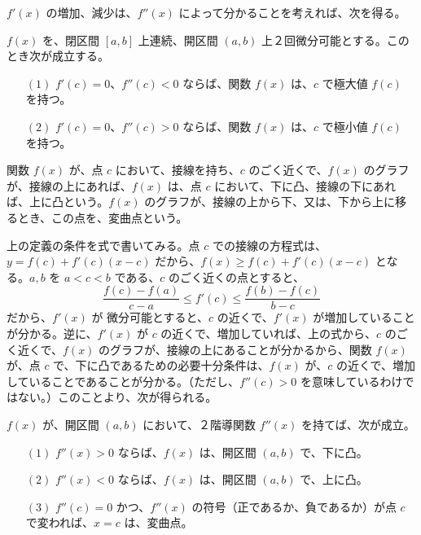 $f'(x)$ の増加、減少は、$f''(x)$ によって分かることを考えれば、次を得る。
\begin{prop}
$f(x)$ を、閉区間 $[a,b]$ 上連続、開区間 $(a,b)$  上２回微分可能とする。このとき次が成立する。
\begin{itemize}
\item[$(1)$] $f'(c) = 0$、$f''(c) < 0$ ならば、関数 $f(x)$ は、$c$ で極大値 $f(c)$ を持つ。
\item[$(2)$] $f'(c) = 0$、$f''(c) > 0$ ならば、関数 $f(x)$ は、$c$ で極小値 $f(c)$ を持つ。
\end{itemize}
\end{prop}

\begin{definition}
関数 $f(x)$ が、点 $c$ において、接線を持ち、$c$ のごく近くで、$f(x)$ のグラフが、接線の上にあれば、$f(x)$ は、点 $c$ において、下に凸、接線の下にあれば、上に凸という。$f(x)$ のグラフが、接線の上から下、又は、下から上に移るとき、この点を、変曲点という。
\end{definition}

上の定義の条件を式で書いてみる。点 $c$ での接線の方程式は、$y = f(c) + f'(c) (x-c)$ だから、$f(x)\geq f(c) + f'(c)(x-c)$ となる。$a, b$ を $a < c < b$  である、$c$ のごく近くの点とすると、
$$\frac{f(c) - f(a)}{c-a} \leq f'(c) \leq \frac{f(b) - f(c)}{b-c}$$
だから、$f'(x)$ が 微分可能とすると、$c$ の近くで、$f'(x)$ が増加していることが分かる。逆に、$f'(x)$ が $c$ の近くで、増加していれば、上の式から、$c$ のごく近くで、$f(x)$ のグラフが、接線の上にあることが分かるから、関数 $f(x)$ が、点 $c$ で、下に凸であるための必要十分条件は、$f(x)$ が、$c$ の近くで、増加していることであることが分かる。（ただし、$f''(c)>0$ を意味しているわけではない。）このことより、次が得られる。

\begin{prop}
$f(x)$ が、開区間 $(a,b)$ において、２階導関数 $f''(x)$ を持てば、次が成立。
\begin{itemize}
\item[$(1)$]  $f''(x)>0$ ならば、$f(x)$ は、開区間 $(a,b)$ で、下に凸。
\item[$(2)$]  $f''(x)<0$ ならば、$f(x)$ は、開区間 $(a,b)$ で、上に凸。
\item[$(3)$]  $f''(c) = 0$ かつ、$f''(x)$ の符号（正であるか、負であるか）が点 $c$ で変われば、$x = c$ は、変曲点。
\end{itemize}
\end{prop}

